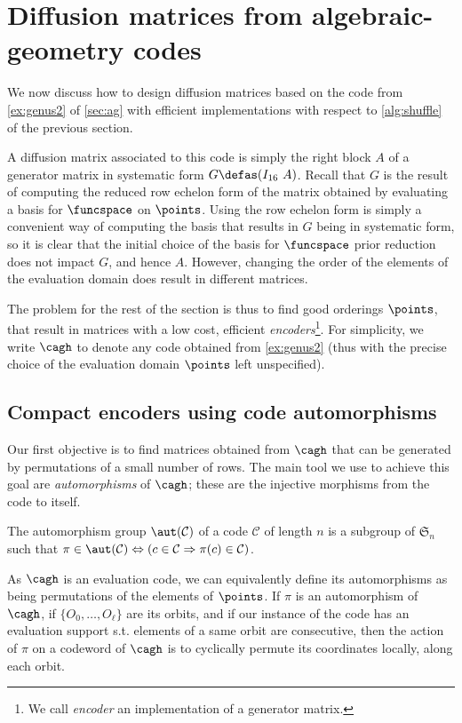 \section{Diffusion matrices from algebraic-geometry codes}
\label{matt}

We now discuss how to design diffusion matrices based on the code from \autoref{ex:genus2} of \autoref{sec:ag}
with efficient implementations with respect to \autoref{alg:shuffle} of the previous section.

A diffusion matrix associated to this code is simply the right block $A$ of a generator matrix in systematic form $G \defas (I_{16}~A)$.
Recall that $G$ is the result of computing the reduced row echelon form of the matrix obtained by evaluating a basis for $\funcspace$
on $\points$. Using the row echelon form is simply a convenient way of computing the basis that results in $G$ being in systematic
form, so it is clear that the initial choice of the basis for $\funcspace$ prior reduction does not impact $G$, and hence $A$.
However, changing the order of the elements of the evaluation domain does result in different matrices.

The problem for the rest of the section is thus to find good orderings $\points$,
that result in matrices with a low cost, \ie efficient \emph{encoders}\footnote{We call \emph{encoder} an implementation of a generator matrix.}.
For simplicity, we write $\cagh$ to denote any code obtained from \autoref{ex:genus2} (thus with the precise choice of the evaluation domain $\points$ left unspecified).


\subsection{Compact encoders using code automorphisms}
\label{sec:autos}

Our first objective is to find matrices obtained from $\cagh$ that can be generated by permutations of a small number of rows.
The main tool we use to achieve this goal are \emph{automorphisms} of $\cagh$; these are the injective morphisms from the code to itself.
\begin{defi}
The automorphism group $\aut(\mathcal{C})$ of a code $\mathcal{C}$ of length $n$ is a subgroup of $\mathfrak{S}_n$ such that
$\pi \in \aut(\mathcal{C}) \Leftrightarrow (c \in \mathcal{C} \Rightarrow \pi(c) \in \mathcal{C})$.
\end{defi}

As $\cagh$ is an evaluation code, we can equivalently define its automorphisms as being permutations of the elements of $\points$.
If $\pi$ is an automorphism of $\cagh$, if $\{O_0, \ldots, O_\ell\}$ are its orbits, and if our instance of the code
has an evaluation support s.t. elements of a same orbit are consecutive,
then the action of $\pi$ on a codeword of $\cagh$
is to cyclically permute its coordinates locally, along each orbit.

